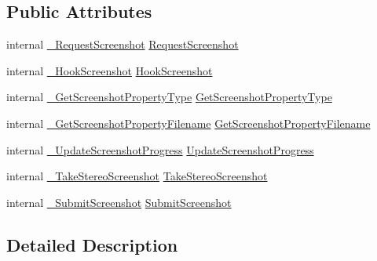 \subsection*{Public Attributes}
\begin{DoxyCompactItemize}
\item 
internal \mbox{\hyperlink{struct_valve_1_1_v_r_1_1_i_v_r_screenshots_af21bcc56545f1819ed8b9e255f184fd4}{\+\_\+\+Request\+Screenshot}} \mbox{\hyperlink{struct_valve_1_1_v_r_1_1_i_v_r_screenshots_a3609d78ec65ba91f56a01ebf1b03ac37}{Request\+Screenshot}}
\item 
internal \mbox{\hyperlink{struct_valve_1_1_v_r_1_1_i_v_r_screenshots_ab3be7fe0de54d42becef8b3c699340c3}{\+\_\+\+Hook\+Screenshot}} \mbox{\hyperlink{struct_valve_1_1_v_r_1_1_i_v_r_screenshots_a697fa15e63c07e55d436021b067eee7d}{Hook\+Screenshot}}
\item 
internal \mbox{\hyperlink{struct_valve_1_1_v_r_1_1_i_v_r_screenshots_a2a0f40d54fa11a1803abb2ddca3e3748}{\+\_\+\+Get\+Screenshot\+Property\+Type}} \mbox{\hyperlink{struct_valve_1_1_v_r_1_1_i_v_r_screenshots_ae370a1a006956604839bcd67ca391d07}{Get\+Screenshot\+Property\+Type}}
\item 
internal \mbox{\hyperlink{struct_valve_1_1_v_r_1_1_i_v_r_screenshots_a9bd7c0035c07384f2e690cfbbf210752}{\+\_\+\+Get\+Screenshot\+Property\+Filename}} \mbox{\hyperlink{struct_valve_1_1_v_r_1_1_i_v_r_screenshots_a79c4630669a682e76690126e55d9be85}{Get\+Screenshot\+Property\+Filename}}
\item 
internal \mbox{\hyperlink{struct_valve_1_1_v_r_1_1_i_v_r_screenshots_ad750f504a656fd6a77bda11e07a52cd3}{\+\_\+\+Update\+Screenshot\+Progress}} \mbox{\hyperlink{struct_valve_1_1_v_r_1_1_i_v_r_screenshots_a1103b838e4318b925742b5d3d38e7c9a}{Update\+Screenshot\+Progress}}
\item 
internal \mbox{\hyperlink{struct_valve_1_1_v_r_1_1_i_v_r_screenshots_ac9eb5e2fe44b9b5a3af94f18dee0dca0}{\+\_\+\+Take\+Stereo\+Screenshot}} \mbox{\hyperlink{struct_valve_1_1_v_r_1_1_i_v_r_screenshots_ac71945882f46a7d76cb5a59e3793df08}{Take\+Stereo\+Screenshot}}
\item 
internal \mbox{\hyperlink{struct_valve_1_1_v_r_1_1_i_v_r_screenshots_aa0b6789713552885537583e9ca318010}{\+\_\+\+Submit\+Screenshot}} \mbox{\hyperlink{struct_valve_1_1_v_r_1_1_i_v_r_screenshots_ad7a70ed809af5f640c6b3124fd81ed6b}{Submit\+Screenshot}}
\end{DoxyCompactItemize}


\subsection{Detailed Description}


